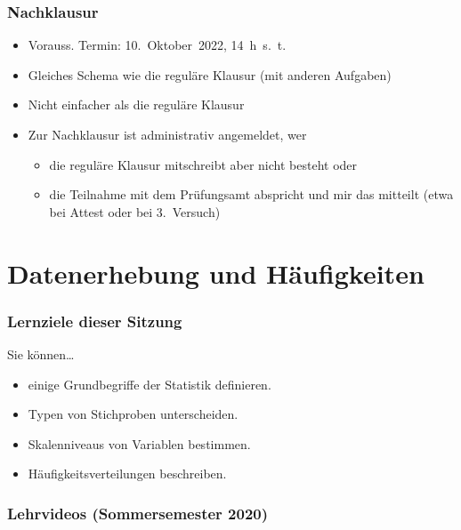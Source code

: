 \documentclass[
  11pt,
  ngerman,
  a4paper,
]{report}
\providecommand{\tightlist}{%
  \setlength{\itemsep}{0pt}\setlength{\parskip}{0pt}}
\begin{document}
\hypertarget{nachklausur}{%
\subsection*{Nachklausur}\label{nachklausur}}

\begin{itemize}
\tightlist
\item
  Vorauss. Termin: 10.~Oktober~2022, 14~h~s.~t.
\item
  Gleiches Schema wie die reguläre Klausur (mit anderen Aufgaben)
\item
  Nicht einfacher als die reguläre Klausur
\item
  Zur Nachklausur ist administrativ angemeldet, wer

  \begin{itemize}
  \tightlist
  \item
    die reguläre Klausur mitschreibt aber nicht besteht oder
  \item
    die Teilnahme mit dem Prüfungsamt abspricht und mir das mitteilt (etwa bei Attest oder bei 3.~Versuch)
  \end{itemize}
\end{itemize}

\hypertarget{datenerhebung-und-huxe4ufigkeiten}{%
\chapter{Datenerhebung und Häufigkeiten}\label{datenerhebung-und-huxe4ufigkeiten}}

\hypertarget{lernziele-dieser-sitzung}{%
\subsection*{Lernziele dieser Sitzung}\label{lernziele-dieser-sitzung}}

Sie können\ldots{}

\begin{itemize}
\tightlist
\item
  einige Grundbegriffe der Statistik definieren.
\item
  Typen von Stichproben unterscheiden.
\item
  Skalenniveaus von Variablen bestimmen.
\item
  Häufigkeitsverteilungen beschreiben.
\end{itemize}

\hypertarget{lehrvideos-sommersemester-2020}{%
\subsection*{Lehrvideos (Sommersemester 2020)}\label{lehrvideos-sommersemester-2020}}
\end{document}
